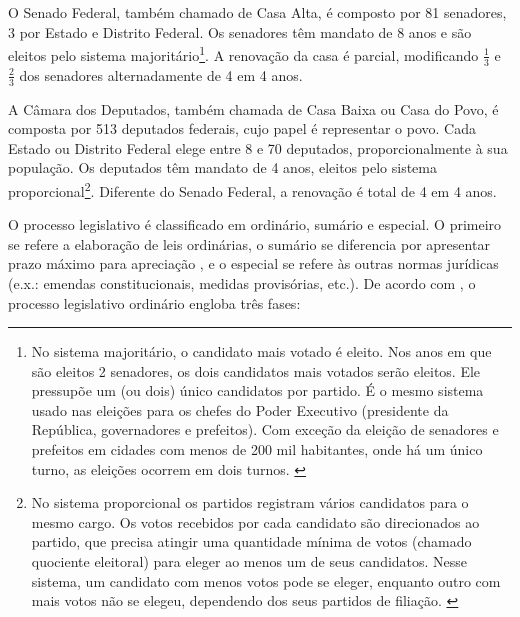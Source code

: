 \documentclass[a4paper,titlepage]{ppgi}\usepackage[]{graphicx}\usepackage[]{color}
\begin{document}
O Senado Federal, também chamado de Casa Alta, é composto por 81 senadores, 3
por Estado e Distrito Federal. Os senadores têm mandato de 8 anos e são eleitos
pelo sistema majoritário\footnote{No sistema majoritário, o candidato mais
votado é eleito. Nos anos em que são eleitos 2 senadores, os dois candidatos
mais votados serão eleitos. Ele pressupõe um (ou dois) único candidatos por
partido. É o mesmo sistema usado nas eleições para os chefes do Poder Executivo
(presidente da República, governadores e prefeitos). Com exceção da eleição de
senadores e prefeitos em cidades com menos de 200 mil habitantes, onde há um
único turno, as eleições ocorrem em dois turnos. \cite{Carneiro2013}}. A
renovação da casa é parcial, modificando $\frac{1}{3}$ e $\frac{2}{3}$ dos
senadores alternadamente de 4 em 4 anos.

A Câmara dos Deputados, também chamada de Casa Baixa ou Casa do Povo, é
composta por 513 deputados federais, cujo papel é representar o povo. Cada
Estado ou Distrito Federal elege entre 8 e 70 deputados, proporcionalmente à
sua população. Os deputados têm mandato de 4 anos, eleitos pelo sistema
proporcional\footnote{No sistema proporcional os partidos registram vários
candidatos para o mesmo cargo. Os votos recebidos por cada candidato são
direcionados ao partido, que precisa atingir uma quantidade mínima de votos
(chamado quociente eleitoral) para eleger ao menos um de seus candidatos. Nesse
sistema, um candidato com menos votos pode se eleger, enquanto outro com mais
votos não se elegeu, dependendo dos seus partidos de filiação.
\cite{Carneiro2013,Bramatti2014}}. Diferente do Senado Federal, a renovação é
total de 4 em 4 anos.

O processo legislativo é classificado em ordinário, sumário e especial. O
primeiro se refere a elaboração de leis ordinárias, o sumário se diferencia por
apresentar prazo máximo para apreciação \cite[art. 64]{CF1988}, e o especial se
refere às outras normas jurídicas (e.x.: emendas constitucionais, medidas
provisórias, etc.). De acordo com , o processo
legislativo ordinário engloba três fases: 
\end{document}
